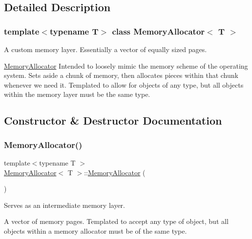 \subsection{Detailed Description}
\subsubsection*{template$<$typename T$>$\newline
class Memory\+Allocator$<$ T $>$}

A custom memory layer. Essentially a vector of equally sized pages. 

\hyperlink{class_memory_allocator}{Memory\+Allocator} Intended to loosely mimic the memory scheme of the operating system. Sets aside a chunk of memory, then allocates pieces within that chunk whenever we need it. Templated to allow for objects of any type, but all objects within the memory layer must be the same type. 

\subsection{Constructor \& Destructor Documentation}
\mbox{\label{class_memory_allocator_a9c7ca60e8881012d0311c98689359c91}} 
\subsubsection{\texorpdfstring{Memory\+Allocator()}{MemoryAllocator()}}
{\footnotesize\ttfamily template$<$typename T $>$ \\
\hyperlink{class_memory_allocator}{Memory\+Allocator}$<$ T $>$\+::\hyperlink{class_memory_allocator}{Memory\+Allocator} (\begin{DoxyParamCaption}{ }\end{DoxyParamCaption})}

Serves as an intermediate memory layer.

A vector of memory pages. Templated to accept any type of object, but all objects within a memory allocator must be of the same type. \mbox{\label{class_memory_allocator_a06ba8aa77baa4fea0096da7f0c720e7b}} 
